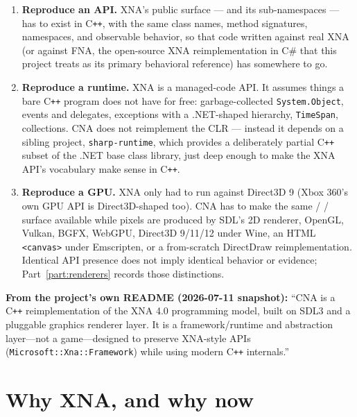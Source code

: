 \begin{enumerate}
  \item \textbf{Reproduce an API.} XNA's public surface --- 
        and its sub-namespaces --- has to exist in C\texttt{++}, with the same class names,
        method signatures, namespaces, and observable behavior, so that code written against
        real XNA (or against FNA, the open-source XNA reimplementation in C\# that this
        project treats as its primary behavioral reference) has somewhere to go.
  \item \textbf{Reproduce a runtime.} XNA is a managed-code API. It assumes things a bare
        C\texttt{++} program does not have for free: garbage-collected \texttt{System.Object},
        events and delegates, exceptions with a .NET-shaped hierarchy, \texttt{TimeSpan},
        collections. CNA does not reimplement the CLR --- instead it depends on a sibling
        project, \texttt{sharp-runtime}, which provides a deliberately partial C\texttt{++}
        subset of the .NET base class library, just deep enough to make the XNA API's
        vocabulary make sense in C\texttt{++}.
  \item \textbf{Reproduce a GPU.} XNA only had to run against Direct3D 9 (Xbox 360's
        own GPU API is Direct3D-shaped too). CNA has to make the same 
        / /  surface available while pixels are produced
        by SDL's 2D renderer, OpenGL, Vulkan, BGFX, WebGPU,
        Direct3D 9/11/12 under Wine, an HTML \texttt{<canvas>} under Emscripten, or a
        from-scratch DirectDraw reimplementation. Identical API presence does not imply identical
        behavior or evidence; Part~\ref{part:renderers} records those distinctions.
\end{enumerate}

\begin{sourcenote}
\textbf{From the project's own README (2026-07-11 snapshot):} ``CNA is a C\texttt{++}
reimplementation of the XNA 4.0 programming model, built on SDL3 and a pluggable graphics
renderer layer. It is a framework/runtime and abstraction layer---not a game---designed to
preserve XNA-style APIs (\texttt{Microsoft::Xna::Framework}) while using modern C\texttt{++}
internals.''
\end{sourcenote}

\section{Why XNA, and why now}

